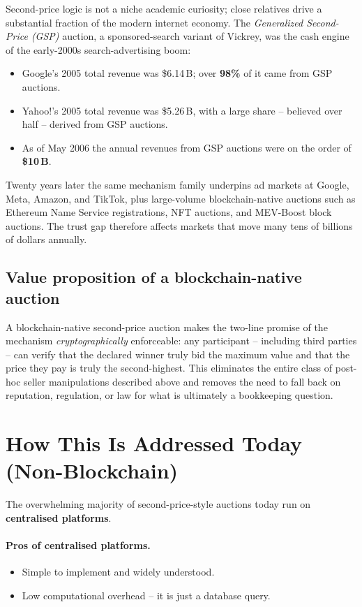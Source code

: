 \documentclass[11pt,a4paper]{article}
\begin{document}
Second-price logic is not a niche academic curiosity; close
relatives drive a substantial fraction of the modern internet economy. The
\emph{Generalized Second-Price (GSP)} auction, a sponsored-search variant of
Vickrey, was the cash engine of the early-2000s search-advertising boom:
\begin{itemize}[leftmargin=*,nosep]
\item Google's 2005 total revenue was \$6.14\,B; over \textbf{98\%} of it came
from GSP auctions.
\item Yahoo!'s 2005 total revenue was \$5.26\,B, with a large share -- believed
over half -- derived from GSP auctions.
\item As of May 2006 the annual revenues from GSP auctions were on the order
of \textbf{\$10\,B}.
\end{itemize}
Twenty years later the same mechanism family underpins ad markets at Google,
Meta, Amazon, and TikTok, plus large-volume blockchain-native auctions such as
Ethereum Name Service registrations, NFT auctions, and MEV-Boost block
auctions. The trust gap therefore affects markets that move many tens of
billions of dollars annually.

\subsection{Value proposition of a blockchain-native auction}

A blockchain-native second-price auction makes the two-line promise of the
mechanism \emph{cryptographically} enforceable: any participant -- including
third parties -- can verify that the declared winner truly bid the maximum
value and that the price they pay is truly the second-highest. This eliminates
the entire class of post-hoc seller manipulations described above and removes
the need to fall back on reputation, regulation, or law for what is ultimately
a bookkeeping question.

\section{How This Is Addressed Today (Non-Blockchain)}

The overwhelming majority of second-price-style auctions today run on
\textbf{centralised platforms}.

\paragraph{Pros of centralised platforms.}
\begin{itemize}[leftmargin=*,nosep]
\item Simple to implement and widely understood.
\item Low computational overhead -- it is just a database query.
\end{itemize}
\end{document}
